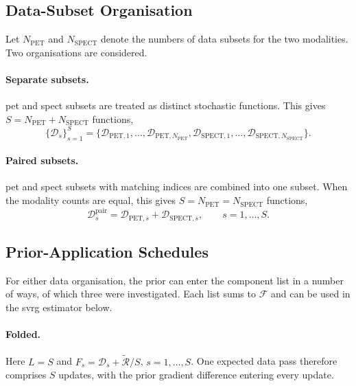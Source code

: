 \subsection{Data-Subset Organisation}
\label{subsec:subset_data_organisation}

Let $N_{\mathrm{PET}}$ and $N_{\mathrm{SPECT}}$ denote the numbers of data subsets for the two modalities. Two organisations are considered.

\paragraph{Separate subsets.}
\gls{pet} and \gls{spect} subsets are treated as distinct stochastic functions. This gives $S=N_{\mathrm{PET}}+N_{\mathrm{SPECT}}$ functions,
\begin{equation}
    \{\mathcal{D}_s\}_{s=1}^{S}
    =
    \{
    \mathcal{D}_{\mathrm{PET},1},\ldots,\mathcal{D}_{\mathrm{PET},N_{\mathrm{PET}}},
    \mathcal{D}_{\mathrm{SPECT},1},\ldots,\mathcal{D}_{\mathrm{SPECT},N_{\mathrm{SPECT}}}
    \}.
    \label{eq:separate_subset_functions}
\end{equation}

\paragraph{Paired subsets.}
\gls{pet} and \gls{spect} subsets with matching indices are combined into one subset. When the modality counts are equal, this gives $S=N_{\mathrm{PET}}=N_{\mathrm{SPECT}}$ functions,
\begin{equation}
    \mathcal{D}^{\mathrm{pair}}_s
    =
    \mathcal{D}_{\mathrm{PET},s}
    +
    \mathcal{D}_{\mathrm{SPECT},s},
    \qquad s=1,\ldots,S.
    \label{eq:paired_subset_functions}
\end{equation}

\subsection{Prior-Application Schedules}
\label{subsec:subset_prior_schedules}

For either data organisation, the prior can enter the component list in a number of ways, of which three were investigated. Each list sums to $\mathcal{F}$ and can be used in the \gls{svrg} estimator below.

\paragraph{Folded.}
Here $L=S$ and $F_s=\mathcal D_s+\widetilde{\mathcal R}/S$, $s=1,\ldots,S$. One expected data pass therefore comprises $S$ updates, with the prior gradient difference entering every update.

